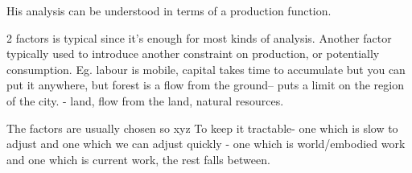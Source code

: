 His analysis can be understood in terms of a production function. 


 2 factors is typical since it's enough for most kinds of analysis. Another factor typically used to introduce another constraint on production, or potentially consumption. Eg. labour is mobile, capital takes time to accumulate but you can put it anywhere, but forest is a flow from the ground-- puts a limit on the region of the city. - land, flow from the land, natural resources.
 
 The factors are usually chosen so xyz
 To keep it tractable- one which is slow to adjust and one which we can adjust quickly - one which is world/embodied work and one which is current work, the rest falls between.



